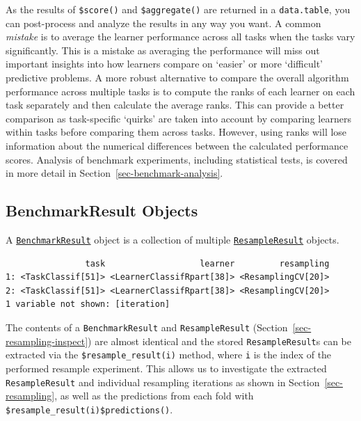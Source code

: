 As the results of \texttt{\$score()} and \texttt{\$aggregate()} are
returned in a \texttt{data.table}, you can post-process and analyze the
results in any way you want. A common \emph{mistake} is to average the
learner performance across all tasks when the tasks vary significantly.
This is a mistake as averaging the performance will miss out important
insights into how learners compare on `easier' or more `difficult'
predictive problems. A more robust alternative to compare the overall
algorithm performance across multiple tasks is to compute the ranks of
each learner on each task separately and then calculate the average
ranks. This can provide a better comparison as task-specific `quirks'
are taken into account by comparing learners within tasks before
comparing them across tasks. However, using ranks will lose information
about the numerical differences between the calculated performance
scores. Analysis of benchmark experiments, including statistical tests,
is covered in more detail in Section~\ref{sec-benchmark-analysis}.

\hypertarget{sec-bm-resamp}{%
\subsection{BenchmarkResult Objects}\label{sec-bm-resamp}}

A
\href{https://mlr3.mlr-org.com/reference/BenchmarkResult.html}{\texttt{BenchmarkResult}}
object is a collection of multiple
\href{https://mlr3.mlr-org.com/reference/ResampleResult.html}{\texttt{ResampleResult}}
objects.

\begin{Shaded}
\begin{Highlighting}[]
\OtherTok{=} 
\NormalTok{bmrdt[}\SpecialCharTok{:}\NormalTok{, .(task, learner, resampling, iteration)]}
\end{Highlighting}
\end{Shaded}

\begin{verbatim}
                task                   learner         resampling
1: <TaskClassif[51]> <LearnerClassifRpart[38]> <ResamplingCV[20]>
2: <TaskClassif[51]> <LearnerClassifRpart[38]> <ResamplingCV[20]>
1 variable not shown: [iteration]
\end{verbatim}

The contents of a \texttt{BenchmarkResult} and \texttt{ResampleResult}
(Section~\ref{sec-resampling-inspect}) are almost identical and the
stored \texttt{ResampleResult}s can be extracted via the
\texttt{\$resample\_result(i)} method, where \texttt{i} is the index of
the performed resample experiment. This allows us to investigate the
extracted \texttt{ResampleResult} and individual resampling iterations
as shown in Section~\ref{sec-resampling}, as well as the predictions
from each fold with \texttt{\$resample\_result(i)\$predictions()}.

